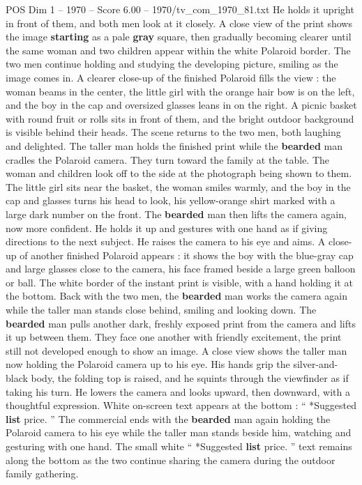 \begin{textsample}{POS Dim 1 – 1970 – Score 6.00 – 1970/tv\_com\_1970\_81.txt}
He holds it upright in front of them, and both men look at it closely.
A close view of the print shows the image \textbf{starting} as a pale \textbf{gray} square, then gradually becoming clearer until the same woman and two children appear within the white Polaroid border.
The two men continue holding and studying the developing picture, smiling as the image comes in.
A clearer close-up of the finished Polaroid fills the view : the woman beams in the center, the little girl with the orange hair bow is on the left, and the boy in the cap and oversized glasses leans in on the right.
A picnic basket with round fruit or rolls sits in front of them, and the bright outdoor background is visible behind their heads.
The scene returns to the two men, both laughing and delighted.
The taller man holds the finished print while the \textbf{bearded} man cradles the Polaroid camera.
They turn toward the family at the table.
The woman and children look off to the side at the photograph being shown to them.
The little girl sits near the basket, the woman smiles warmly, and the boy in the cap and glasses turns his head to look, his yellow-orange shirt marked with a large dark number on the front.
The \textbf{bearded} man then lifts the camera again, now more confident.
He holds it up and gestures with one hand as if giving directions to the next subject.
He raises the camera to his eye and aims.
A close-up of another finished Polaroid appears : it shows the boy with the blue-gray cap and large glasses close to the camera, his face framed beside a large green balloon or ball.
The white border of the instant print is visible, with a hand holding it at the bottom.
Back with the two men, the \textbf{bearded} man works the camera again while the taller man stands close behind, smiling and looking down.
The \textbf{bearded} man pulls another dark, freshly exposed print from the camera and lifts it up between them.
They face one another with friendly excitement, the print still not developed enough to show an image.
A close view shows the taller man now holding the Polaroid camera up to his eye.
His hands grip the silver-and-black body, the folding top is raised, and he squints through the viewfinder as if taking his turn.
He lowers the camera and looks upward, then downward, with a thoughtful expression.
White on-screen text appears at the bottom : “ *Suggested \textbf{list} price. ” The commercial ends with the \textbf{bearded} man again holding the Polaroid camera to his eye while the taller man stands beside him, watching and gesturing with one hand.
The small white “ *Suggested \textbf{list} price. ” text remains along the bottom as the two continue sharing the camera during the outdoor family gathering.

\end{textsample}
